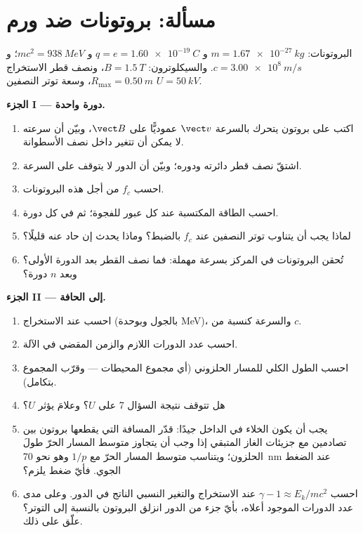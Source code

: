 \section{مسألة: بروتونات ضد ورم}

\begin{problem}
\label{pb:b1:charged-particles:1}
البروتونات: $m = \qty{1.67e-27}{kg}$ و $q = e = \qty{1.60e-19}{C}$ و $mc^2 =
\qty{938}{MeV}$؛ و $c = \qty{3.00e8}{m/s}$. والسيكلوترون: $B = \qty{1.5}{T}$،
ونصف قطر الاستخراج $R_{\max} = \qty{0.50}{m}$، وسعة توتر النصفين
$U = \qty{50}{kV}$.

\medskip
\noindent\textbf{الجزء I --- دورة واحدة.}
\begin{enumerate}
  \item اكتب  على بروتون يتحرك بالسرعة $\vect v$
        عموديًّا على $\vect B$، وبيّن أن سرعته لا يمكن أن تتغير
        داخل نصف الأسطوانة.
  \item اشتقّ نصف قطر دائرته ودوره؛ وبيّن أن
        الدور لا يتوقف على السرعة.
  \item احسب  $f_c$ من أجل هذه البروتونات.
  \item احسب الطاقة المكتسبة عند كل عبور للفجوة؛ ثم في كل دورة.
  \item لماذا يجب أن يتناوب توتر النصفين عند $f_c$ بالضبط؟ وماذا يحدث
        إن حاد عنه قليلًا؟
  \item تُحقن البروتونات في المركز بسرعة مهملة: فما
        نصف القطر بعد الدورة الأولى؟ وبعد $n$ دورة؟
\end{enumerate}

\medskip
\noindent\textbf{الجزء II --- إلى الحافة.}
\begin{enumerate}[resume]
  \item احسب  عند الاستخراج (بالجول وبوحدة \unit{MeV})، والسرعة
        كنسبة من $c$.
  \item احسب عدد الدورات اللازم والزمن المقضي في الآلة.
  \item احسب الطول الكلي للمسار الحلزوني (أي مجموع المحيطات ---
        وقرّب المجموع بتكامل).
  \item هل تتوقف نتيجة السؤال 7 على $U$؟ وعلامَ يؤثر $U$؟
  \item يجب أن يكون الخلاء في الداخل جيدًا: قدّر المسافة التي يقطعها
        بروتون بين تصادمين مع جزيئات الغاز المتبقي إذا وجب أن يتجاوز
        متوسط المسار الحرّ طولَ الحلزون؛ ويتناسب متوسط المسار الحرّ
        مع $1/p$ وهو نحو \qty{70}{nm} عند الضغط
        الجوي. فأيّ ضغط يلزم؟
  \item احسب $\gamma - 1 \approx E_k/mc^2$ عند الاستخراج والتغير النسبي
        الناتج في الدور. وعلى مدى عدد الدورات الموجود أعلاه، بأيّ جزء
        من الدور انزلق البروتون بالنسبة إلى التوتر؟ علّق على ذلك.
\end{enumerate}


\end{problem}
